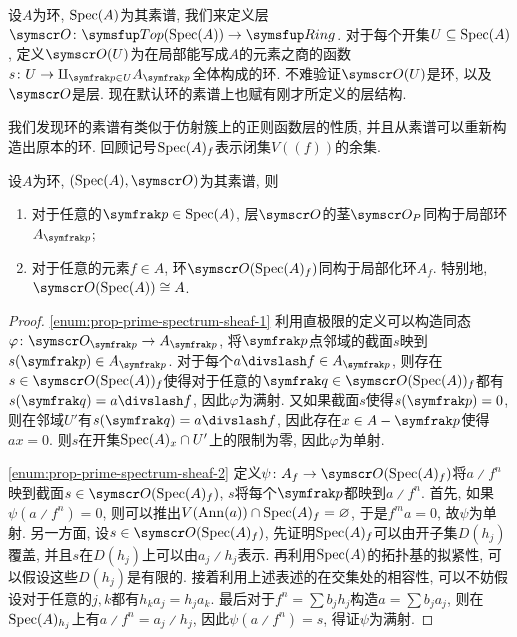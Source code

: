 设$A$为环, $\operatorname{Spec} (A)$为其素谱, 我们来定义层$\sheaf{O}\colon \cat{Top}(\Spec (A))\to \cat{Ring}$. 对于每个开集$U\subseteq \operatorname{Spec} (A)$, 定义$\sheaf{O}(U)$为在局部能写成$A$的元素之商的函数$s\colon U\to \amalg_{\ideal{p}\in U}A_{\ideal{p}}$全体构成的环. 不难验证$\sheaf{O}(U)$是环, 以及$\sheaf{O}$是层. 现在默认环的素谱上也赋有刚才所定义的层结构.

我们发现环的素谱有类似于仿射簇上的正则函数层的性质, 并且从素谱可以重新构造出原本的环. 回顾记号$\operatorname{Spec}(A)_{f}$表示闭集$V((f))$的余集.

\begin{proposition}\label{prop:primespectrumsheaf}
  设$A$为环, $(\Spec (A), \OO)$为其素谱, 则
  \begin{enumerate}
    \item\label{enum:prop-prime-spectrum-sheaf-1} 对于任意的$\ideal{p}\in\Spec (A)$, 层$\OO$的茎$\OO_P$同构于局部环$A_{\ideal{p}}$;
    \item\label{enum:prop-prime-spectrum-sheaf-2} 对于任意的元素$f\in A$, 环$\OO(\Spec (A)_f)$同构于局部化环$A_f$. 特别地, $\OO (\Spec (A))\cong A$.
  \end{enumerate}
\end{proposition}

\begin{proof}
  \ref{enum:prop-prime-spectrum-sheaf-1} 利用直极限的定义可以构造同态$\varphi\colon \OO_{\ideal{p}}\to A_{\ideal{p}}$, 将$\ideal{p}$点邻域的截面$s$映到$s(\ideal{p})\in A_{\ideal{p}}$. 对于每个$a{\divslash}f\in A_{\ideal{p}}$, 则存在$s\in\OO (\Spec (A))_f$使得对于任意的$\ideal{q}\in \OO (\Spec (A))_f$都有$s(\ideal{q})=a{\divslash}f$, 因此$\varphi$为满射. 又如果截面$s$使得$s(\ideal{p})=0$, 则在邻域$U'$有$s(\ideal{q})=a{\divslash}f$, 因此存在$x\in A-\ideal{p}$使得$ax=0$. 则$s$在开集$\operatorname{Spec} (A)_x\cap U'$上的限制为零, 因此$\varphi$为单射.

  \ref{enum:prop-prime-spectrum-sheaf-2} 定义$\psi\colon A_f\to \OO (\Spec (A)_f)$将$a{\divslash}f^n$映到截面$s\in \OO (\Spec (A)_f)$, $s$将每个$\ideal{p}$都映到$a{\divslash}f^n$. 首先, 如果$\psi(a{\divslash}f^n)=0$, 则可以推出$V(\operatorname{Ann} (a))\cap \operatorname{Spec} (A)_f=\varnothing$, 于是$f^ma=0$, 故$\psi$为单射. 另一方面, 设$s\in \OO (\Spec (A)_f)$, 先证明$\operatorname{Spec} (A)_f$可以由开子集$D(h_j)$覆盖, 并且$s$在$D(h_j)$上可以由$a_j{\divslash}h_j$表示. 再利用$\operatorname{Spec} (A)$的拓扑基的拟紧性, 可以假设这些$D(h_j)$是有限的. 接着利用上述表述的在交集处的相容性, 可以不妨假设对于任意的$j,k$都有$h_ka_j=h_ja_k$. 最后对于$f^n=\sum b_jh_j$构造$a=\sum b_ja_j$, 则在$\operatorname{Spec} (A)_{h_j}$上有$a{\divslash}f^n=a_j{\divslash}h_j$, 因此$\psi (a{\divslash}f^n)=s$, 得证$\psi$为满射.
\end{proof}

